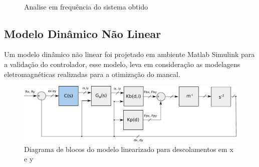 \begin{figure}[!ht]
	\centering
	\\
	
	\caption{Analise em frequência do sistema obtido}
	\label{fig:bode:rlocus:pnt:operacao}
\end{figure}

\subsection{Modelo Dinâmico Não Linear}

Um modelo dinâmico não linear foi projetado em ambiente Matlab Simulink para a validação do controlador, esse modelo, leva em consideração as modelagens eletromagnéticas realizadas para a otimização do mancal.

\begin{figure}[th!]
	\centering
	\includegraphics[width=1\linewidth]{../Figs/Modelagem/diagrama_blocos_modelo_linear}
	\caption{Diagrama de blocos do modelo linearizado para descolamentos em x e y}
	\label{fig:diagrama:blocos:modelo:linear}
\end{figure}

